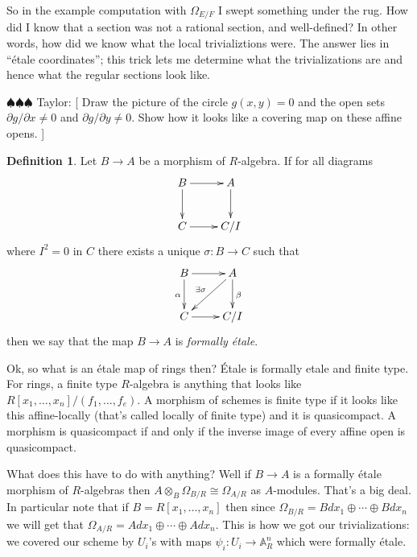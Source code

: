\documentclass[12pt]{article}
\numberwithin{equation}{section}
\theoremstyle{definition}
\newtheorem{definition}[theorem]{Definition}
\theoremstyle{remark}
\renewcommand{\AA}{\mathbb{A}}
\newcommand{\taylor}[1]{{\color{blue} \sf $\spadesuit\spadesuit\spadesuit$ Taylor: [#1]}}
\begin{document}
So in the example computation with $\Omega_{E/F}$ I swept something under the rug. 
How did I know that a section was not a rational section, and well-defined?
In other words, how did we know what the local trivializtions were. 
The answer lies in ``\'etale coordinates''; this trick lets me determine what the trivializations are and hence what the regular sections look like.

\taylor{
	Draw the picture of the circle $g(x,y)=0$ and the open sets $\partial g/\partial x\neq 0$ and $\partial g/\partial y \neq 0$. Show how it looks like a covering map on these affine opens.  
}

\begin{definition}
	Let $B \to A$ be a morphism of $R$-algebra.
	If for all diagrams 
	$$\xymatrix{
		B \ar[r] \ar[d] & A\ar[d] \\
		C \ar[r] & C/I 
	}$$
	where $I^2=0$ in $C$ there exists a unique $\sigma:B \to C$ such that 
	\begin{equation}\label{eqn:infinitesimal-lifting}
	\xymatrix{
		B \ar[r] \ar[d]_{\alpha}& A\ar[d]^{\beta} \ar[dl]_{\exists \sigma} \\
		C \ar[r] & C/I 
	}
	\end{equation}
	then we say that the map $B\to A$ is \emph{formally \'etale}.	
\end{definition}

Ok, so what is an \'etale map of rings then? \'Etale is formally etale and finite type. 
For rings, a finite type $R$-algebra is anything that looks like  $R[x_1,\ldots,x_n]/(f_1,\ldots,f_e)$. 
A morphism of schemes is finite type if it looks like this affine-locally (that's called locally of finite type) and it is quasicompact.
A morphism is quasicompact if and only if the inverse image of every affine open is quasicompact. 

What does this have to do with anything?
Well if $B \to A$ is a formally \'etale morphism of $R$-algebras then $A\otimes_B \Omega_{B/R} \cong \Omega_{A/R}$ as $A$-modules. 
That's a big deal. 
In particular note that if $B = R[x_1,\ldots,x_n]$ then since $\Omega_{B/R} = B dx_1 \oplus \cdots \oplus B dx_n$ we will get that $\Omega_{A/R} = Adx_1 \oplus \cdots \oplus A dx_n$. 
This is how we got our trivializations: we covered our scheme by $U_i$'s with maps $\psi_i:U_i \to \AA^n_R$ which were formally \'etale. 
\end{document}
